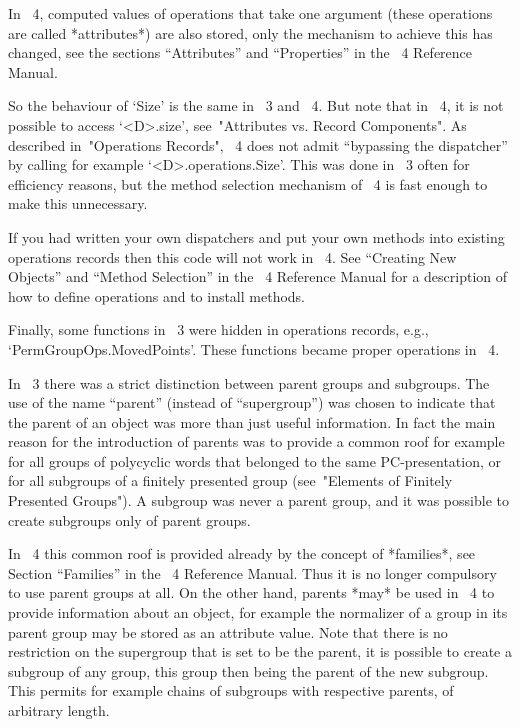 In {\GAP}~4, computed values of operations that take one argument
(these operations are called *attributes*) are also stored, only the
mechanism to achieve this has changed, see the sections ``Attributes''
and ``Properties'' in the {\GAP}~4 Reference Manual.

So the behaviour of `Size' is the same in {\GAP}~3 and {\GAP}~4.  But
note that in {\GAP}~4, it is not possible to access `<D>.size',
see~"Attributes vs. Record Components".  As described in~"Operations
Records", {\GAP}~4 does not admit ``bypassing the dispatcher'' by
calling for example `<D>.operations.Size'.  This was done in {\GAP}~3
often for efficiency reasons, but the method selection mechanism of
{\GAP}~4 is fast enough to make this unnecessary.

If you had written your own dispatchers and put your own methods into
existing operations records then this code will not work in {\GAP}~4.
See ``Creating New Objects'' and ``Method Selection'' in the {\GAP}~4
Reference Manual for a description of how to define operations and 
to install methods.

Finally, some functions in {\GAP}~3 were hidden in
operations records, e.g., `PermGroupOps.MovedPoints'.
These functions became proper operations in {\GAP}~4.



In {\GAP}~3 there was a strict distinction between parent groups and
subgroups.
The use of the name ``parent'' (instead of ``supergroup'')
was chosen to indicate that the parent of an object was more than just
useful information.
In fact the main reason for the introduction of parents was to provide
a common roof for example for all groups of polycyclic words that
belonged to the same PC-presentation, or for all subgroups of a finitely
presented group (see~"Elements of Finitely Presented Groups").
A subgroup was never a parent group, and it was possible to create
subgroups only of parent groups.

In {\GAP}~4 this common roof is provided already by the concept of
*families*, see Section ``Families'' in the {\GAP}~4 Reference Manual.
Thus it is no longer compulsory to use parent groups at all.
On the other hand, parents *may* be used in {\GAP}~4 to provide
information about an object, for example the normalizer of a group in its
parent group may be stored as an attribute value.
Note that there is no restriction on the supergroup that is set to be
the parent,
it is possible to create a subgroup of
any group, this group then being the parent of the new subgroup.
This permits for example chains of subgroups with respective parents,
of arbitrary length.

